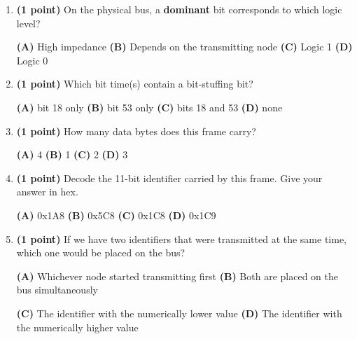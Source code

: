 \documentclass[10pt]{article}
\begin{document}
\begin{enumerate}[label=\textbf{\arabic*.}, leftmargin=*, itemsep=4pt]
\begin{enumerate}[label=(\alph*), leftmargin=*, itemsep=3pt]
\item \textbf{(1 point)} On the physical bus, a \textbf{dominant} bit corresponds to which logic level?

\centerline{\textbf{(A)} High impedance \qquad \textbf{(B)} Depends on the transmitting node \qquad \textbf{(C)} Logic 1 \qquad \textbf{(D)} Logic 0}

\item \textbf{(1 point)} Which bit time(s) contain a bit-stuffing bit?

\centerline{\textbf{(A)} bit 18 only \qquad \textbf{(B)} bit 53 only \qquad \textbf{(C)} bits 18 and 53 \qquad \textbf{(D)} none}

\item \textbf{(1 point)} How many data bytes does this frame carry?

\centerline{\textbf{(A)} 4 \qquad \textbf{(B)} 1 \qquad \textbf{(C)} 2 \qquad \textbf{(D)} 3}

\item \textbf{(1 point)} Decode the 11-bit identifier carried by this frame. Give your answer in hex.

\centerline{\textbf{(A)} 0x1A8 \qquad \textbf{(B)} 0x5C8 \qquad \textbf{(C)} 0x1C8 \qquad \textbf{(D)} 0x1C9}

\item \textbf{(1 point)} If we have two identifiers that were transmitted at the same time, which one would be placed on the bus?

\centerline{\textbf{(A)} Whichever node started transmitting first \qquad \textbf{(B)} Both are placed on the bus simultaneously}

\centerline{\textbf{(C)} The identifier with the numerically lower value \qquad \textbf{(D)} The identifier with the numerically higher value}
\end{enumerate}

\end{enumerate}
\end{document}
